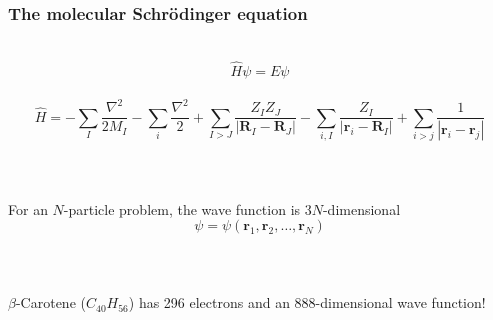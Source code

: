 \documentclass[mathserif, 10pt]{beamer}
\begin{document}
\begin{frame}
    \frametitle{The molecular Schr\"{o}dinger equation}
    \ \\
    \begin{equation}
	\nonumber
	\hat{H}\psi = E\psi
    \end{equation}
    \ \\
    \begin{equation}
	\nonumber
	\hat{H} =   -\sum_I \frac{\nabla^2}{2M_I} - \sum_i \frac{\nabla^2}{2}
		    +\sum_{I>J} \frac{Z_IZ_J}{|\boldsymbol{R}_I-\boldsymbol{R}_J|} 
		    -\sum_{i,I} \frac{Z_I}{|\boldsymbol{r}_i-\boldsymbol{R}_I|} 
		    +\sum_{i>j} \frac{1}{|\boldsymbol{r}_i-\boldsymbol{r}_j|} 
    \end{equation}
    \ \\
    \ \\
    \ \\
    \centering
    For an $N$-particle problem, the wave function is $3N$-dimensional
    \begin{equation}
	\nonumber
	\psi = \psi(\boldsymbol{r}_1,\boldsymbol{r}_2,\dots,\boldsymbol{r}_N)
    \end{equation}
    \ \\
    \ \\
    \ \\
    \pause
    \centering
    $\beta$-Carotene ($C_{40}H_{56}$) has 296 electrons and an 888-dimensional wave function!
\end{frame}
\end{document}
